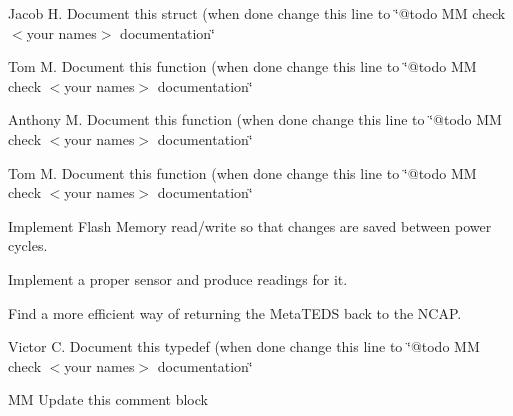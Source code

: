 \begin{DoxyRefList}
\item[\label{todo__todo000012}%
\hypertarget{todo__todo000012}{}%
global\+Scope$>$ Global \hyperlink{group__list_gac466ff011100add5899254ca98ff8b93}{list\+\_\+t} ]Jacob H. Document this struct (when done change this line to \char`\"{}@todo M\+M check $<$your names$>$ documentation\char`\"{}  
\item[\label{todo__todo000031}%
\hypertarget{todo__todo000031}{}%
global\+Scope$>$ Global \hyperlink{group__list_ga71bd31a42180cf44b8ee3186c77765a8}{List\+\_\+\+Unlink\+First} (\hyperlink{structlist__t}{list\+\_\+t} $\ast$list)]Tom M. Document this function (when done change this line to \char`\"{}@todo M\+M check $<$your names$>$ documentation\char`\"{}  
\item[\label{todo__todo000030}%
\hypertarget{todo__todo000030}{}%
global\+Scope$>$ Global \hyperlink{group__list_ga215870e22beacb7be2d84aebcaf23e01}{List\+\_\+\+Unlink\+Item} (\hyperlink{structlist__t}{list\+\_\+t} $\ast$list, void $\ast$item)]Anthony M. Document this function (when done change this line to \char`\"{}@todo M\+M check $<$your names$>$ documentation\char`\"{}  
\item[\label{todo__todo000032}%
\hypertarget{todo__todo000032}{}%
global\+Scope$>$ Global \hyperlink{group__list_ga79393298ee82007018a285e87f763857}{List\+\_\+\+Unlink\+Last} (\hyperlink{structlist__t}{list\+\_\+t} $\ast$list)]Tom M. Document this function (when done change this line to \char`\"{}@todo M\+M check $<$your names$>$ documentation\char`\"{}  
\item[\label{todo__todo000035}%
\hypertarget{todo__todo000035}{}%
global\+Scope$>$ Global \hyperlink{_t_i_m1_8h_ab0bf2da84344cc59e76fdf07beb14e73}{Meta\+T\+E\+D\+S\+Init} (void)]Implement Flash Memory read/write so that changes are saved between power cycles.  
\item[\label{todo__todo000036}%
\hypertarget{todo__todo000036}{}%
global\+Scope$>$ Global \hyperlink{_t_i_m1_8h_afc000f73c85278581fda25ab38797497}{Read\+Channel\+Transducer\+Data} (char $\ast$\+Channel\+I\+D)]Implement a proper sensor and produce readings for it. 
\item[\label{todo__todo000038}%
\hypertarget{todo__todo000038}{}%
global\+Scope$>$ Global \hyperlink{_t_i_m1_8h_af966cacd113c4fb6a2ebdcd1082af15b}{Read\+Meta\+T\+E\+D\+S} (void)]Find a more efficient way of returning the Meta\+T\+E\+D\+S back to the N\+C\+A\+P.  
\item[\label{todo__todo000009}%
\hypertarget{todo__todo000009}{}%
global\+Scope$>$ Global \hyperlink{group__list_gaec41fb00279c4e4ec77286fa803cbcd2}{sort\+\_\+fn\+\_\+t} )(void $\ast$, void $\ast$)]Victor C. Document this typedef (when done change this line to \char`\"{}@todo M\+M check $<$your names$>$ documentation\char`\"{}  
\item[\label{todo__todo000033}%
\hypertarget{todo__todo000033}{}%
Page \hyperlink{group__subsys}{Sub\+System module command interface} ]M\+M Update this comment block 


\end{DoxyRefList}
